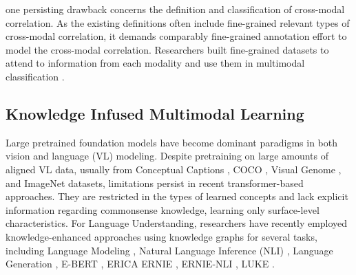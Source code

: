 one persisting drawback 
concerns the definition and classification of cross-modal correlation. As the existing definitions often include fine-grained relevant types of cross-modal correlation, it demands comparably fine-grained annotation effort 
to model the cross-modal correlation.
Researchers built fine-grained datasets to attend to information from each modality and use them in multimodal classification \cite{chen2015velda,henning2017estimating,otto2020characterization,zhang2018equal,kruk2019integrating,vempala2019categorizing}.


\vspace{-2.9mm}
\subsection{Knowledge Infused Multimodal Learning}
\label{sec:knowledge-infusion-mm-learning}
\vspace{-1mm}
Large pretrained foundation models have become dominant paradigms in both vision and language (VL) modeling. Despite pretraining on large amounts of aligned VL data, usually from Conceptual Captions \cite{Sharma2018-qk}, COCO \cite{Ren2015-oq}, Visual Genome \cite{Krishna2017-xz}, and ImageNet \cite{deng2009imagenet} datasets, limitations persist in recent transformer-based approaches. They are restricted in the types of learned concepts and lack explicit information regarding commonsense knowledge, learning only surface-level characteristics.  For Language Understanding, researchers have recently employed knowledge-enhanced approaches using knowledge graphs for several tasks, including Language Modeling \cite{yasunaga2022deep,zhang2022greaselm,Logan2019-tk,Lu2021-xe,kursuncu2020kil}, Natural Language Inference (NLI) \cite{Ni2021-db}, Language Generation \cite{Yu2022-uv,peters2019knowledge}, E-BERT \cite{Wu2022-ah}, ERICA \cite{Qin2020-et} ERNIE \cite{Zhang2021-ov}, ERNIE-NLI \cite{Bauer2021-rv}, LUKE \cite{Yamada2020-zc}.  

